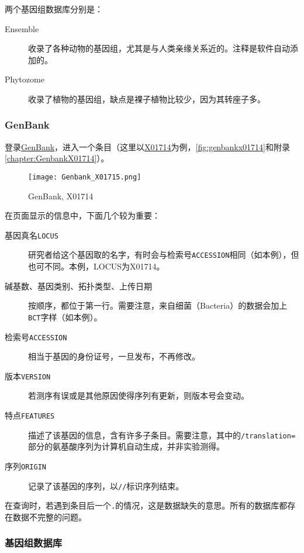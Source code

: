 两个基因组数据库分别是：
\begin{description}
	\item[Ensemble] 收录了各种动物的基因组，尤其是与人类亲缘关系近的。注释是软件自动添加的。
	\item[Phytozome] 收录了植物的基因组，缺点是裸子植物比较少，因为其转座子多。
\end{description}

\subsubsection{GenBank}

登录\href{https://www.ncbi.nlm.nih.gov/genbank/}{GenBank}，进入一个条目（这里以\href{https://www.ncbi.nlm.nih.gov/nuccore/X01714}{X01714}为例，\autoref{fig:genbankx01714}和附录\autoref{chapter:GenbankX01714}）。

\begin{figure}[htbp]
	\centering
	\texttt{[image: Genbank\_X01715.png]}
	\caption{GenBank, X01714}
	\label{fig:genbankx01714}
\end{figure}

在页面显示的信息中，下面几个较为重要：

\begin{description}
	\item[基因真名\texttt{LOCUS}] 研究者给这个基因取的名字，有时会与检索号\texttt{ACCESSION}相同（如本例），但也可不同。本例，LOCUS为X01714。
	\item[碱基数、基因类别、拓扑类型、上传日期] 按顺序，都位于第一行。需要注意，来自细菌（Bacteria）的数据会加上\texttt{BCT}字样（如本例）。
	\item[检索号\texttt{ACCESSION}] 相当于基因的身份证号，一旦发布，不再修改。
	\item[版本\texttt{VERSION}] 若测序有误或是其他原因使得序列有更新，则版本号会变动。
	\item[特点\texttt{FEATURES}] 描述了该基因的信息，含有许多子条目。需要注意，其中的\texttt{/translation=}部分的氨基酸序列为计算机自动生成，并非实验测得。
	\item[序列\texttt{ORIGIN}] 记录了该基因的序列，以\texttt{//}标识序列结束。
\end{description}

在查询时，若遇到条目后一个\texttt{.}的情况，这是数据缺失的意思。所有的数据库都存在数据不完整的问题。

\subsubsection{基因组数据库}

